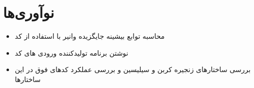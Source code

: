 \chapter*{نوآوری‌ها}
\begin{itemize}
\item
محاسبه توابع بیشینه جایگزیده وانیر با استفاده از کد  
\item 
نوشتن برنامه تولیدکننده ورودی های کد  
\item 
 بررسی ساختارهای زنجیره کربن و  سیلیسین و بررسی عملکرد کدهای فوق در این ساختارها 
\end{itemize}